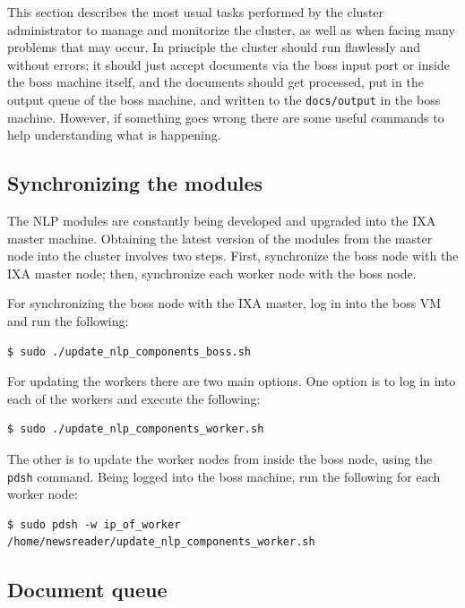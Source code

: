 \documentclass[a4]{article}
\begin{document}
This section describes the most usual tasks performed by the cluster
administrator to manage and monitorize the cluster, as well as when facing
many problems that may occur. In principle the cluster should run flawlessly
and without errors; it should just accept documents via the boss input port
or inside the boss machine itself, and the documents should get processed,
put in the output queue of the boss machine, and written to the
\texttt{docs/output} in the boss machine. However, if something goes wrong
there are some useful commands to help understanding what is happening.



\subsection{Synchronizing the modules}
\label{sec:synchr-modul}

The NLP modules are constantly being developed and upgraded into the IXA
master machine. Obtaining the latest version of the modules from the master
node into the cluster involves two steps. First, synchronize the boss node
with the IXA master node; then, synchronize each worker node with the boss
node.

For synchronizing the boss node with the IXA master, log in into the boss VM
and run the following:

\begin{verbatim}
$ sudo ./update_nlp_components_boss.sh
\end{verbatim}

For updating the workers there are two main options. One option is to log in
into each of the workers and execute the following:

\begin{verbatim}
$ sudo ./update_nlp_components_worker.sh
\end{verbatim}

The other is to update the worker nodes from inside the boss node, using the
\texttt{pdsh} command. Being logged into the boss machine, run the
following for each worker node:

\begin{verbatim}
$ sudo pdsh -w ip_of_worker /home/newsreader/update_nlp_components_worker.sh
\end{verbatim}

\subsection{Document queue}
\label{sec:document-queue}
\end{document}
